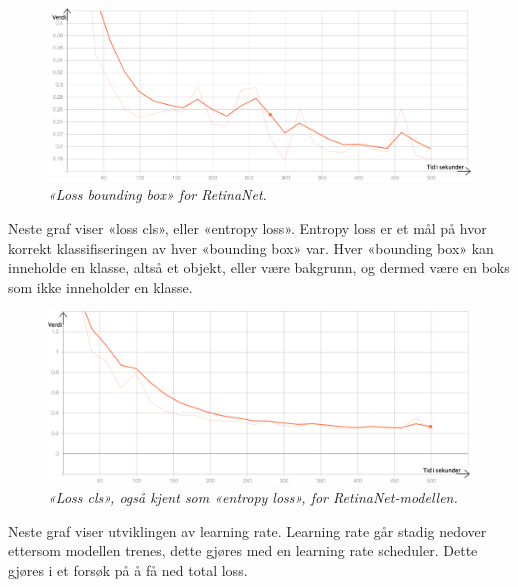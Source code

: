\begin{figure}[H]
\begin{center} 
\includegraphics[scale=0.35]{figures/loss_box_reg_retinanet_3}
\caption{\small \sl «Loss bounding box» for RetinaNet. \label{fig:loss_box_reg_retinanet}}
\end{center}
\end{figure}

Neste graf viser «loss cls», eller «entropy loss». Entropy loss er et mål på hvor korrekt klassifiseringen av hver «bounding box» var. Hver «bounding box» kan inneholde en klasse, altså et objekt, eller være bakgrunn, og dermed være en boks som ikke inneholder en klasse.

\begin{figure}[H]
\begin{center} 
\includegraphics[scale=0.35]{figures/loss_cls_retinanet_4}
\caption{\small \sl «Loss cls», også kjent som «entropy loss», for RetinaNet-modellen. \label{fig:loss_cls_retinanet}}
\end{center}
\end{figure}

Neste graf viser utviklingen av learning rate. Learning rate går stadig nedover ettersom modellen trenes, dette gjøres med en learning rate scheduler. Dette gjøres i et forsøk på å få ned total loss.


